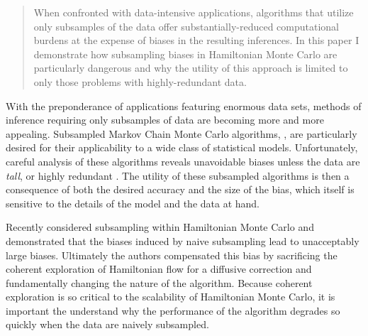 \documentclass{article}
\begin{document}


\begin{abstract}
When confronted with data-intensive applications, algorithms that utilize only subsamples 
of the data offer substantially-reduced computational burdens at the expense of biases
in the resulting inferences.  In this paper I demonstrate how subsampling biases in 
Hamiltonian Monte Carlo are particularly dangerous and why the utility of this approach
is limited to only those problems with highly-redundant data.
\end{abstract}

With the preponderance of applications featuring enormous data sets,
methods of inference requiring only subsamples of data are becoming 
more and more appealing.  Subsampled Markov Chain Monte Carlo 
algorithms, \cite{NeiswangerEtAl:2013, WellingEtAl:2011}, are particularly
desired for their applicability to a wide class of statistical models.  
Unfortunately, careful analysis of these algorithms reveals unavoidable 
biases unless the data are \textit{tall}, or highly redundant 
\cite{BardenetEtAl:2014, TehEtAl:2014, VollmerEtAl:2015}.  
The utility of these subsampled algorithms is then a consequence 
of both the desired accuracy and the size of the bias, which itself 
is sensitive to the details of the model and the data at hand.

Recently \cite{ChenEtAl:2014} considered subsampling within Hamiltonian
Monte Carlo \cite{DuaneEtAl:1987, Neal:2011, BetancourtEtAl:2014} and 
demonstrated that the biases induced by naive subsampling lead to 
unacceptably large biases.  Ultimately the authors compensated this bias by 
sacrificing the coherent exploration of Hamiltonian flow for a diffusive 
correction and fundamentally changing the nature of the algorithm.
Because coherent exploration is so critical to the scalability of Hamiltonian 
Monte Carlo, it is important the understand why the performance of
the algorithm degrades so quickly when the data are naively subsampled.  
\end{document}
